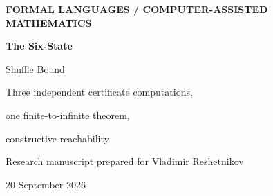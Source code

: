 \documentclass[11pt,letterpaper]{article}
\numberwithin{equation}{section}
\newtheorem{conjecture}[theorem]{Conjecture}
\theoremstyle{definition}
\theoremstyle{remark}
\begin{document}
\hypersetup{pageanchor=false}
\begin{titlepage}
\thispagestyle{empty}
{\color{Teal}\sffamily\bfseries FORMAL LANGUAGES \quad / \quad COMPUTER-ASSISTED MATHEMATICS\par}
\vspace{0.7in}
{\Huge\bfseries\color{Navy}The Six-State\par Shuffle Bound\par}
\vspace{0.22in}
{\Large Three independent certificate computations,\par
one finite-to-infinite theorem,\par constructive reachability\par}
\vspace{0.4in}
{\large Research manuscript prepared for Vladimir Reshetnikov\par}
\vspace{0.1in}
{20 September 2026\par}
\vspace{0.4in}
\begin{abstract}
The shuffle operation interleaves two words without changing the order of the
letters within either word. Its exact worst-case deterministic state complexity
is the subject of a published conjecture. This manuscript gives a
computer-assisted proof of the following conjecture in the range
$\min(m,n)\le6$.

\begin{conjecture}[Published shuffle state-complexity conjecture]
\label{conj:main}
For all $m,n\ge2$, the worst-case deterministic state complexity of the shuffle
is
\begin{equation}\label{eq:F}
 F(m,n)=2^{mn-1}+2^{(m-1)(n-1)}(2^{m-1}-1)(2^{n-1}-1).
\end{equation}
\end{conjecture}


\end{abstract}
\end{titlepage}
\end{document}
